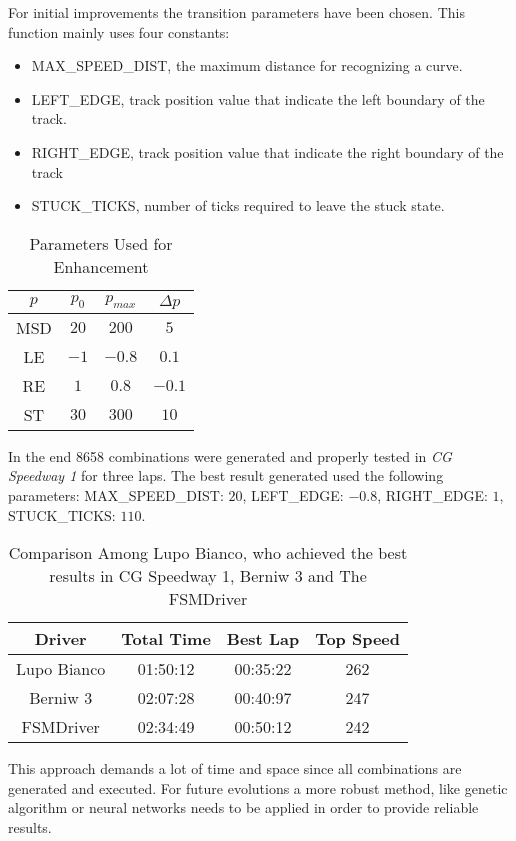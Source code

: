 For initial improvements the transition parameters have been chosen. This function mainly uses four constants:
\begin{itemize}
\item MAX\_SPEED\_DIST, the maximum distance for recognizing a curve.
\item LEFT\_EDGE, track position value that indicate the left boundary of the track.
\item RIGHT\_EDGE, track position value that indicate the right boundary of the track
\item STUCK\_TICKS, number of ticks required to leave the stuck state.
\end{itemize}


\begin{table}[h]
\renewcommand{\arraystretch}{1.3}
\caption{Parameters Used for Enhancement}
\label{parameter_table}
\centering
\begin{tabular}{c||c||c||c}
\hline \bfseries $p$ &\bfseries $p_0$ &\bfseries $ p_{max}$ &\bfseries $\Delta p$ \\
\hline
\hline MSD & $20$ & $200$ & $5$ \\ 
\hline LE & $-1$ & $-0.8$ & $0.1$ \\ 
\hline RE & $1$ & $0.8$ & $-0.1$ \\ 
\hline ST & $30$ & $300$ & $10$ \\ 
\hline 
\end{tabular} 
\end{table}

In the end 8658 combinations were generated and properly tested in \textit{CG Speedway 1}
for three laps. The best result generated used the following parameters: MAX\_SPEED\_DIST: $20$, LEFT\_EDGE: $-0.8$, RIGHT\_EDGE: $1$, STUCK\_TICKS: $110$.

\begin{table}[h]
\renewcommand{\arraystretch}{1.3}
\caption{Comparison Among Lupo Bianco, who achieved the best results in CG Speedway 1, Berniw 3 and The FSMDriver}
\label{results_table}
\centering

\begin{tabular}{c||c||c||c}
\hline \bfseries Driver &\bfseries Total Time &\bfseries Best Lap &\bfseries Top Speed \\
\hline
\hline Lupo Bianco & 01:50:12 & 00:35:22 & 262 \\
\hline Berniw 3 & 02:07:28 & 00:40:97 & 247 \\ 
\hline FSMDriver & 02:34:49 & 00:50:12 & 242 \\ 
\hline 
\end{tabular}
\end{table}
This approach demands a lot of time and space since all combinations are generated and executed. For future evolutions a more robust method, like genetic algorithm or neural networks needs to be applied in order to provide reliable results.
